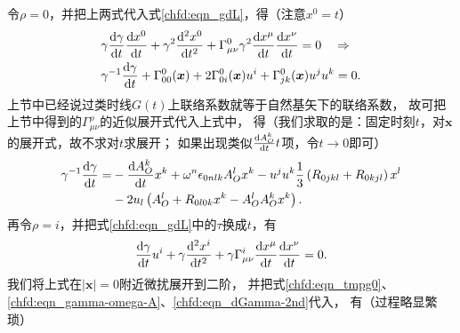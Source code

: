 令$\rho=0$，并把上两式代入式\eqref{chfd:eqn_gdL}，得（注意$x^0=t$）
\begin{equation}
\begin{aligned}
    &\gamma \frac{{\rm d} \gamma}{{\rm d} t} \frac{{\rm d} x^0}{{\rm d} t}
    +\gamma^2 \frac{{\rm d}^2 x^0}{{\rm d} t^2}     + \Gamma_{\mu\nu}^0
    \gamma^2 \frac{{\rm d} x^\mu}{{\rm d} t}  \frac{{\rm d} x^\nu}{{\rm d} t} =0
    \quad \Rightarrow \\
    &\gamma^{-1}\frac{{\rm d} \gamma}{{\rm d} t}  +  \Gamma_{00}^0(\boldsymbol{x})
     + 2 \Gamma_{0i}^0(\boldsymbol{x}) u^i
     +  \Gamma_{jk}^0(\boldsymbol{x}) u^j u^k =0 .
\end{aligned}
\end{equation}
上节中已经说过类时线$G(t)$上联络系数就等于自然基矢下的联络系数，
故可把上节中得到的$\Gamma^\rho_{\mu\nu}$的近似展开式代入上式中，
得（我们求取的是：固定时刻$t$，对$\boldsymbol{x}$的展开式，故不求对$t$求展开；
如果出现类似$\frac{{\rm d}A_{O}^k}{{\rm d}t} t$项，令$t\to 0$即可）
\begin{equation}\label{chfd:eqn_tmpg0}
\begin{aligned}
    \gamma^{-1} \frac{{\rm d} \gamma}{{\rm d} t}  =&
     -\frac{{\rm d}A_{O}^k}{{\rm d}t}x^k + \omega^n \epsilon_{0nlk} A_{O}^l x^k
     - u^j u^k \frac{1}{3} \left(  {R}_{0 jkl} +{R}_{0 kjl}   \right)x^l \\
    &  - 2 u_l \left(A^l_O + R_{0 l 0 k} x^k - A_{O}^l A_{O}^k x^k \right) .
\end{aligned}
\end{equation}
再令$\rho=i$，并把式\eqref{chfd:eqn_gdL}中的$\tau$换成$t$，有
\begin{equation}\label{chfd:eqn_fra}
     \frac{{\rm d} \gamma}{{\rm d} t} u^i 
     +\gamma \frac{{\rm d}^2 x^i}{{\rm d} t^2}
     +\gamma \Gamma_{\mu\nu}^i
     \frac{{\rm d} x^\mu}{{\rm d} t}  \frac{{\rm d} x^\nu}{{\rm d} t} =0 .
\end{equation}
我们将上式在$|\boldsymbol{x}|= 0$附近微扰展开到二阶，
并把式\eqref{chfd:eqn_tmpg0}、\eqref{chfd:eqn_gamma-omega-A}、\eqref{chfd:eqn_dGamma-2nd}代入，
有（过程略显繁琐）
\setlength{\mathindent}{0em}

